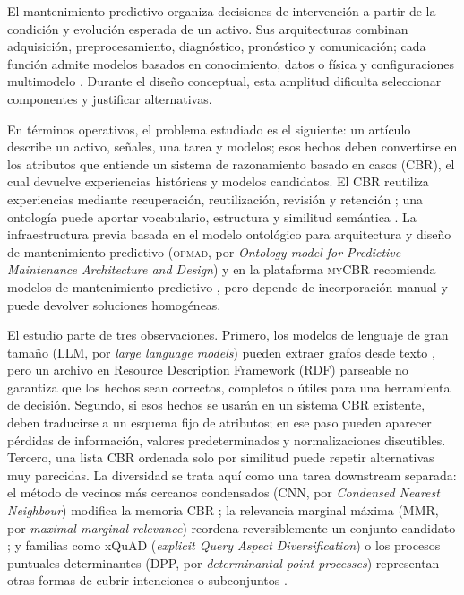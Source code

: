 \documentclass[11pt,a4paper]{article}
\newcommand{\OPMAD}{\textsc{opmad}}
\newcommand{\myCBR}{\textsc{myCBR}}
\begin{document}
El mantenimiento predictivo organiza decisiones de intervención a partir de la condición y evolución esperada de un activo. Sus arquitecturas combinan adquisición, preprocesamiento, diagnóstico, pronóstico y comunicación; cada función admite modelos basados en conocimiento, datos o física y configuraciones multimodelo \citep{MonteroJimenez2020Survey}. Durante el diseño conceptual, esta amplitud dificulta seleccionar componentes y justificar alternativas.

En términos operativos, el problema estudiado es el siguiente: un artículo describe un activo, señales, una tarea y modelos; esos hechos deben convertirse en los atributos que entiende un sistema de razonamiento basado en casos (CBR), el cual devuelve experiencias históricas y modelos candidatos. El CBR reutiliza experiencias mediante recuperación, reutilización, revisión y retención \citep{Aamodt1994CBR,LopezDeMantaras2005CBR}; una ontología puede aportar vocabulario, estructura y similitud semántica \citep{Gruber1993Ontology,AmailefLu2013OntologyCBR,Qin2018OntologyCBR}. La infraestructura previa basada en el modelo ontológico para arquitectura y diseño de mantenimiento predictivo (\OPMAD{}, por \emph{Ontology model for Predictive Maintenance Architecture and Design}) y en la plataforma \myCBR{} recomienda modelos de mantenimiento predictivo \citep{MonteroJimenez2021OPMADCBR,MunozHernandez2021OntologyCBR}, pero depende de incorporación manual y puede devolver soluciones homogéneas.

El estudio parte de tres observaciones. Primero, los modelos de lenguaje de gran tamaño (LLM, por \emph{large language models}) pueden extraer grafos desde texto \citep{Pan2024LLMKG,Lairgi2024IText2KG}, pero un archivo en Resource Description Framework (RDF) parseable no garantiza que los hechos sean correctos, completos o útiles para una herramienta de decisión. Segundo, si esos hechos se usarán en un sistema CBR existente, deben traducirse a un esquema fijo de atributos; en ese paso pueden aparecer pérdidas de información, valores predeterminados y normalizaciones discutibles. Tercero, una lista CBR ordenada solo por similitud puede repetir alternativas muy parecidas. La diversidad se trata aquí como una tarea downstream separada: el método de vecinos más cercanos condensados (CNN, por \emph{Condensed Nearest Neighbour}) modifica la memoria CBR \citep{MunozPena2025Diversity}; la relevancia marginal máxima (MMR, por \emph{maximal marginal relevance}) reordena reversiblemente un conjunto candidato \citep{CarbonellGoldstein1998MMR}; y familias como xQuAD (\emph{explicit Query Aspect Diversification}) o los procesos puntuales determinantes (DPP, por \emph{determinantal point processes}) representan otras formas de cubrir intenciones o subconjuntos \citep{Santos2010xQuAD,Gan2020DPP}.
\end{document}
